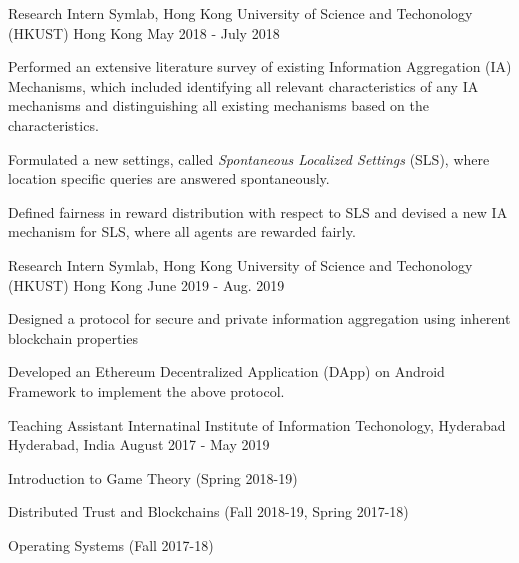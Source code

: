 


\begin{cventries}

    \cventry
    {Research Intern} %
    {Symlab, Hong Kong University of Science and Techonology (HKUST)} %
    {Hong Kong} %
    {May 2018 - July 2018} %
    {
    \begin{cvitems} %
        \item {Performed an extensive literature survey of existing Information Aggregation (IA) Mechanisms, which included identifying all relevant characteristics of any IA mechanisms and distinguishing all existing mechanisms based on the characteristics.}
        \item {Formulated a new settings, called \emph{Spontaneous Localized Settings} (SLS), where location specific queries are answered spontaneously.}
        \item {Defined fairness in reward distribution with respect to SLS and devised a new IA mechanism for SLS, where all agents are rewarded fairly.}
    \end{cvitems}
    }

    \cventry
    {Research Intern} %
    {Symlab, Hong Kong University of Science and Techonology (HKUST)} %
    {Hong Kong} %
    {June 2019 - Aug. 2019} %
    {
    \begin{cvitems} %
        \item {Designed a protocol for secure and private information aggregation using inherent blockchain properties}
        \item {Developed an Ethereum Decentralized Application (DApp) on Android Framework to implement the above protocol.}
    \end{cvitems}
    }

    \cventry
    {Teaching Assistant} %
    {Internatinal Institute of Information Techonology, Hyderabad} %
    {Hyderabad, India} %
    {August 2017 - May 2019} %
    {
    \begin{cvitems} %
        \item {Introduction to Game Theory (Spring 2018-19)}
        \item {Distributed Trust and Blockchains (Fall 2018-19, Spring 2017-18)}
        \item {Operating Systems (Fall 2017-18)}
    \end{cvitems}
    }

\end{cventries}
